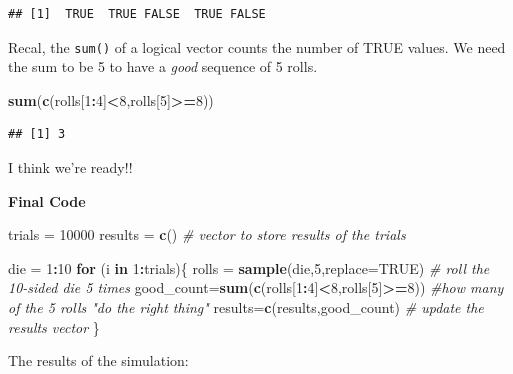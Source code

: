 \documentclass[
]{book}
\newenvironment{Shaded}{\begin{snugshade}}{\end{snugshade}}
\newcommand{\AttributeTok}[1]{\textcolor[rgb]{0.13,0.29,0.53}{#1}}
\newcommand{\CommentTok}[1]{\textcolor[rgb]{0.56,0.35,0.01}{\textit{#1}}}
\newcommand{\ConstantTok}[1]{\textcolor[rgb]{0.56,0.35,0.01}{#1}}
\newcommand{\ControlFlowTok}[1]{\textcolor[rgb]{0.13,0.29,0.53}{\textbf{#1}}}
\newcommand{\DecValTok}[1]{\textcolor[rgb]{0.00,0.00,0.81}{#1}}
\newcommand{\FunctionTok}[1]{\textcolor[rgb]{0.13,0.29,0.53}{\textbf{#1}}}
\newcommand{\NormalTok}[1]{#1}
\newcommand{\OtherTok}[1]{\textcolor[rgb]{0.56,0.35,0.01}{#1}}
\newcommand{\SpecialCharTok}[1]{\textcolor[rgb]{0.81,0.36,0.00}{\textbf{#1}}}
\theoremstyle{definition}
\theoremstyle{definition}
\theoremstyle{definition}
\theoremstyle{definition}
\theoremstyle{remark}
\begin{document}
\begin{verbatim}
## [1]  TRUE  TRUE FALSE  TRUE FALSE
\end{verbatim}

Recal, the \texttt{sum()} of a logical vector counts the number of TRUE values. We need the sum to be 5 to have a \emph{good} sequence of 5 rolls.

\begin{Shaded}
\begin{Highlighting}[]
\FunctionTok{sum}\NormalTok{(}\FunctionTok{c}\NormalTok{(rolls[}\DecValTok{1}\SpecialCharTok{:}\DecValTok{4}\NormalTok{]}\SpecialCharTok{\textless{}}\DecValTok{8}\NormalTok{,rolls[}\DecValTok{5}\NormalTok{]}\SpecialCharTok{\textgreater{}=}\DecValTok{8}\NormalTok{))}
\end{Highlighting}
\end{Shaded}

\begin{verbatim}
## [1] 3
\end{verbatim}

I think we're ready!!

\textbf{Final Code}

\begin{Shaded}
\begin{Highlighting}[]
\NormalTok{trials }\OtherTok{=} \DecValTok{10000}
\NormalTok{results }\OtherTok{=} \FunctionTok{c}\NormalTok{() }\CommentTok{\# vector to store results of the trials}

\NormalTok{die }\OtherTok{=} \DecValTok{1}\SpecialCharTok{:}\DecValTok{10}
\ControlFlowTok{for}\NormalTok{ (i }\ControlFlowTok{in} \DecValTok{1}\SpecialCharTok{:}\NormalTok{trials)\{}
\NormalTok{  rolls }\OtherTok{=} \FunctionTok{sample}\NormalTok{(die,}\DecValTok{5}\NormalTok{,}\AttributeTok{replace=}\ConstantTok{TRUE}\NormalTok{) }\CommentTok{\# roll the 10{-}sided die 5 times}
\NormalTok{  good\_count}\OtherTok{=}\FunctionTok{sum}\NormalTok{(}\FunctionTok{c}\NormalTok{(rolls[}\DecValTok{1}\SpecialCharTok{:}\DecValTok{4}\NormalTok{]}\SpecialCharTok{\textless{}}\DecValTok{8}\NormalTok{,rolls[}\DecValTok{5}\NormalTok{]}\SpecialCharTok{\textgreater{}=}\DecValTok{8}\NormalTok{)) }\CommentTok{\#how many of the 5 rolls "do the right thing"}
\NormalTok{  results}\OtherTok{=}\FunctionTok{c}\NormalTok{(results,good\_count) }\CommentTok{\# update the results vector}
\NormalTok{\}}
\end{Highlighting}
\end{Shaded}

The results of the simulation:
\end{document}
